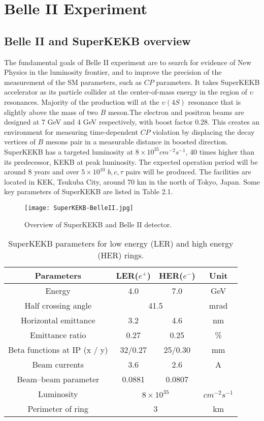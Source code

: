 \chapter{Belle II Experiment}
\section{Belle II and SuperKEKB overview}
The fundamental goals of Belle II experiment are to search for evidence of New Physics in the luminosity frontier, and to improve the precision of the measurement of the SM parameters, such as $CP$ parameters.\cite{b2book} It takes SuperKEKB accelerator as its particle collider at the center-of-mass energy in the region of $\upsilon$ resonances. Majority of the production will at the $\upsilon(4S)$ resonance that is slightly above the mass of two $B$ meson.The electron and positron beams are designed at 7 GeV and 4 GeV respectively, with boost factor 0.28. This creates an environment for measuring time-dependent $CP$ violation by displacing the decay vertices of $B$ mesons pair in a measurable distance in boosted direction. SuperKEKB has a targeted luminosity at $8\times 10^{35} cm^{-2} s^{-1}$, 40 times higher than its predecessor, KEKB at peak luminosity. The expected operation period will be around 8 years and over $5 \times 10^{10} $ $ b, c, \tau$ pairs will be produced. The facilities are located in KEK, Tsukuba City, around 70 km in the north of Tokyo, Japan. Some key parameters of SuperKEKB are listed in Table 2.1. 

\begin{figure}
	\centering 
	\texttt{[image: SuperKEKB-BelleII.jpg]}
	\caption{Overview of SuperKEKB and Belle II detector.}
\end{figure}

\begin{table}[H]
	\centering
	\large
	\caption{SuperKEKB parameters for low energy (LER) and high energy (HER) rings.\cite{b2book}}
	
	\begin{tabular}{c c c c}
		\toprule
		
		Parameters & LER($e^+$) & HER($e^-$) & Unit\\
		\hline
		Energy & 4.0 & 7.0 & GeV\\
		Half crossing angle & \multicolumn{2}{c}{41.5} & mrad\\
		Horizontal emittance & 3.2 & 4.6 & nm \\
		Emittance ratio & 0.27 & 0.25 & \%\\
		Beta functions at IP (x / y) & 32/0.27 & 25/0.30 & mm\\
		Beam currents & 3.6 & 2.6 &  A \\
		Beam–beam parameter & 0.0881 & 0.0807 & {}\\
		Luminosity & \multicolumn{2}{c}{$8\times 10^{35}$} &  $cm^{-2} s^{-1}$\\
		Perimeter of ring & \multicolumn{2}{c}{3} & km\\
		
		\bottomrule
	\end{tabular}
\end{table}


